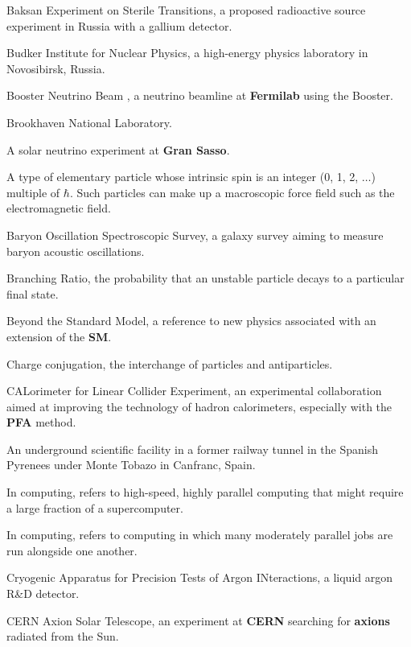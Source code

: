  Baksan Experiment on Sterile Transitions, a proposed 
radioactive source experiment in Russia with a gallium detector.

 Budker Institute for Nuclear Physics, a high-energy
physics laboratory in Novosibirsk, Russia.

 Booster Neutrino Beam , a  neutrino beamline at
{\bf Fermilab} using the Booster.

 Brookhaven National Laboratory.

  A solar neutrino experiment at {\bf Gran
  Sasso}. 

 A type of elementary particle whose intrinsic spin is an
integer (0, 1, 2, $\ldots$) multiple of  $\hbar$.  Such particles can make
up a macroscopic force field such as the electromagnetic field.

 Baryon Oscillation Spectroscopic Survey, a galaxy
survey aiming to measure baryon acoustic oscillations.

 Branching Ratio, the probability that an unstable particle
decays to a particular final state.

  Beyond the Standard Model, a reference to new physics 
associated with an extension of the {\bf SM}. 

 Charge conjugation, the interchange of particles and 
antiparticles.


 CALorimeter for Linear Collider Experiment, an
experimental collaboration aimed at improving the technology of 
hadron calorimeters, especially with the {\bf PFA} method.

  An underground scientific facility
in a former railway tunnel in the Spanish Pyrenees under Monte Tobazo in 
Canfranc, Spain.

  In computing, refers to high-speed, highly
parallel
    computing that might require  a large fraction of a supercomputer.

  In computing, refers to computing in which 
      many moderately parallel jobs are run alongside one another.

 Cryogenic Apparatus for Precision Tests 
of Argon INteractions, a liquid argon R\&D detector.

 CERN Axion Solar Telescope, an experiment 
     at {\bf CERN} searching for {\bf axions} radiated from the Sun.


